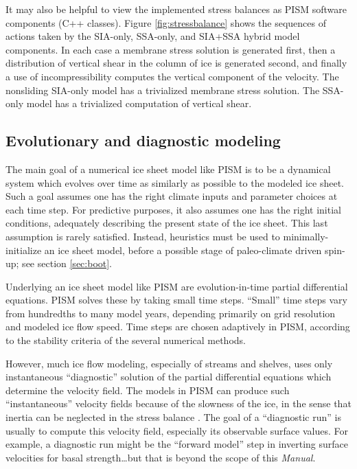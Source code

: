It may also be helpful to view the implemented stress balances as PISM software components (C++ classes).  Figure \ref{fig:stressbalance} shows the sequences of actions taken by the SIA-only, SSA-only, and SIA+SSA hybrid model components.  In each case a membrane stress solution is generated first, then a distribution of vertical shear in the column of ice is generated second, and finally a use of incompressibility computes the vertical component of the velocity.  The nonsliding SIA-only model has a trivialized membrane stress solution.  The SSA-only model has a trivialized computation of vertical shear.


\subsection{Evolutionary and diagnostic modeling} \label{subsect:basicmodes}    The main goal of a numerical ice sheet model like PISM is to be a dynamical system which evolves over time as similarly as possible to the modeled ice sheet.  Such a goal assumes one has the right climate inputs and parameter choices at each time step.  For predictive purposes, it also assumes one has the right initial conditions, adequately describing the present state of the ice sheet.  This last assumption is rarely satisfied.  Instead, heuristics must be used to minimally-initialize an ice sheet model, before a possible stage of paleo-climate driven spin-up; see section \ref{sec:boot}.

Underlying an ice sheet model like PISM are evolution-in-time partial differential equations.  PISM solves these by taking small time steps.  ``Small'' time steps vary from hundredths to many model years, depending primarily on grid resolution and modeled ice flow speed.  Time steps are chosen adaptively in PISM, according to the stability criteria of the several numerical methods.

However, much ice flow modeling, especially of streams and shelves, uses only instantaneous ``diagnostic'' solution of the partial differential equations which determine the velocity field.  The models in PISM can produce such ``instantaneous'' velocity fields because of the slowness of the ice, in the sense that inertia can be neglected in the stress balance \cite{Fowler}.  The goal of a ``diagnostic run'' is usually to compute this velocity field, especially its observable surface values.  For example, a diagnostic run might be the ``forward model'' step in inverting surface velocities for basal strength\dots but that is beyond the scope of this \emph{Manual}.

